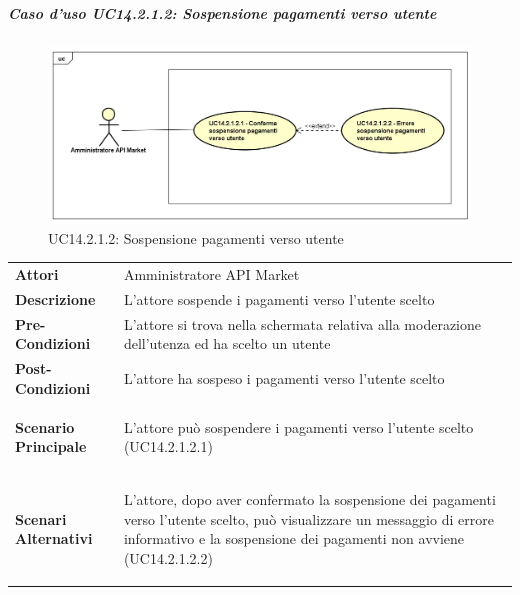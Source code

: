 \newpage
\subparagraph{Caso d'uso UC14.2.1.2: Sospensione pagamenti verso utente}
\label{UC14_2_1_2}
\begin{figure}[ht]
	\centering
	\includegraphics[scale=0.45]{UML/UC14_2_1_2.png}
	\caption{UC14.2.1.2: Sospensione pagamenti verso utente}
\end{figure}

\begin{minipage}{\linewidth}
	\begin{tabular}{ l | p{11cm}}
		\hline
		\rowcolor{Gray}
		\multicolumn{2}{c}{UC14.2.1.2 - Sospensione pagamenti verso utente} \\
		\hline
		\textbf{Attori} & Amministratore API Market \\
		\textbf{Descrizione} & L'attore sospende i pagamenti verso l'utente scelto \\
		\textbf{Pre-Condizioni} & L'attore si trova nella schermata relativa alla moderazione dell'utenza ed ha scelto un utente \\
		\textbf{Post-Condizioni} & L'attore ha sospeso i pagamenti verso l'utente scelto \\
		\textbf{Scenario Principale} & 
		\begin{enumerate*}[label=(\arabic*.),itemjoin={\newline}]
			\item L'attore può sospendere i pagamenti verso l'utente scelto (UC14.2.1.2.1)
		\end{enumerate*}\\
		\textbf{Scenari Alternativi} & 
		\begin{enumerate*}[label=(\arabic*.),itemjoin={\newline}]
			\item L'attore, dopo aver confermato la sospensione dei pagamenti verso l'utente scelto, può visualizzare un messaggio di errore informativo e la sospensione dei pagamenti non avviene (UC14.2.1.2.2)
		\end{enumerate*}\\
	\end{tabular}
\end{minipage}

